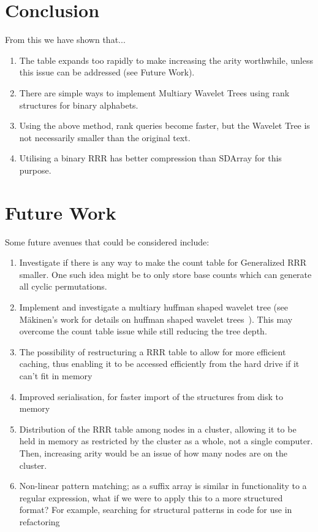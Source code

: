 \section{Conclusion}
From this we have shown that...
\begin{enumerate}
\item
 	The table expands too rapidly to make increasing the arity worthwhile,
	unless this issue can be addressed (see Future Work).
\item
	There are simple ways to implement Multiary Wavelet Trees using rank
	structures for binary alphabets.
\item
	Using the above method, rank queries become faster, but the Wavelet Tree is 
	not necessarily smaller than the original text.
\item
	Utilising a binary RRR has better compression than SDArray for this purpose.
\end{enumerate}

\section{Future Work}
Some future avenues that could be considered include:

\begin{enumerate}
\item
	Investigate if there is any way to make the count table for Generalized RRR 
	smaller. One such idea might be to only store base counts which can
	generate all cyclic permutations.
	
\item
	Implement and investigate a multiary huffman shaped wavelet tree (see 
	M\"{a}kinen's work for details on huffman shaped wavelet
	trees~\cite{huffmanWT:makinen2005}). This may
	overcome the count table issue while still reducing the tree depth.

\item
	The possibility of restructuring a RRR table to allow for more
    efficient caching, thus enabling it to be accessed efficiently from the
	hard drive if it can't fit in memory

\item
	Improved serialisation, for faster import of the structures from disk to
	memory

\item
	Distribution of the RRR table among nodes in a cluster, allowing it to be
	held in memory as restricted by the cluster as a whole, not a single
	computer. Then, increasing arity would be an issue of how many nodes are
	on the cluster.

\item
	Non-linear pattern matching; as a suffix array is similar in functionality
	to a regular expression, what if we were to apply this to a more 
	structured format? For example, searching for structural patterns in code
	for use in refactoring
\end{enumerate}